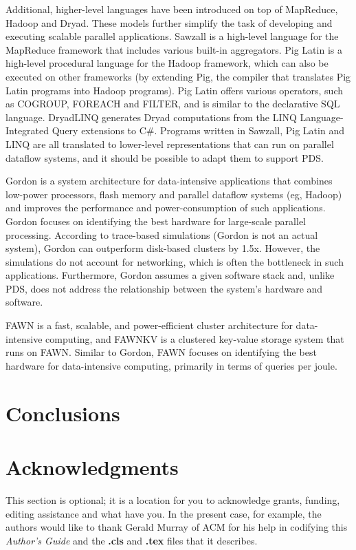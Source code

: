 \documentclass{acm_proc_article-sp}
\begin{document}
Additional, higher-level languages have been introduced on top of MapReduce,
Hadoop and Dryad. These models further simplify the task of developing and
executing scalable parallel applications. Sawzall \cite{sawzall} is a
high-level language for the MapReduce framework that includes various built-in
aggregators. Pig Latin \cite{piglatin} is a high-level procedural language for
the Hadoop framework, which can also be executed on other frameworks (by
extending Pig, the compiler that translates Pig Latin programs into Hadoop
programs). Pig Latin offers various operators, such as COGROUP, FOREACH and
FILTER, and is similar to the declarative SQL language. DryadLINQ
\cite{dryadlinq} generates Dryad computations from the LINQ Language-Integrated
Query extensions to C\#. Programs written in Sawzall, Pig Latin and LINQ are
all translated to lower-level representations that can run on parallel dataflow
systems, and it should be possible to adapt them to support PDS.

Gordon \cite{gordon} is a system architecture for data-intensive applications
that combines low-power processors, flash memory and parallel dataflow systems
(eg, Hadoop) and improves the performance and power-consumption of such
applications. Gordon focuses on identifying the best hardware for large-scale
parallel processing. According to trace-based simulations (Gordon is not an
actual system), Gordon can outperform disk-based clusters by 1.5x. However, the
simulations do not account for networking, which is often the bottleneck in
such applications. Furthermore, Gordon assumes a given software stack and,
unlike PDS, does not address the relationship between the system's hardware and
software.

FAWN \cite{fawn} is a fast, scalable, and power-efficient cluster architecture
for data-intensive computing, and FAWNKV is a clustered key-value
storage system that runs on FAWN. Similar to Gordon, FAWN focuses on identifying
the best hardware for data-intensive computing, primarily in terms of queries
per joule.
\section{Conclusions}


\section{Acknowledgments}
This section is optional; it is a location for you
to acknowledge grants, funding, editing assistance and
what have you.  In the present case, for example, the
authors would like to thank Gerald Murray of ACM for
his help in codifying this \textit{Author's Guide}
and the \textbf{.cls} and \textbf{.tex} files that it describes.
\end{document}
